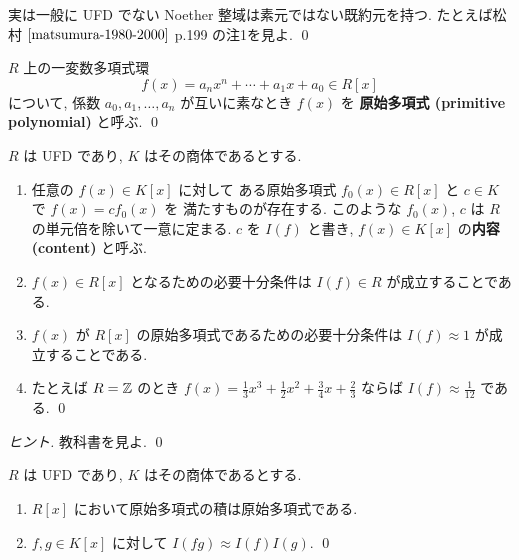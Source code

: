 \documentclass[12pt,twoside]{jarticle}
\begin{document}

\begin{guide}
 実は一般に UFD でない Noether 整域は素元ではない既約元を持つ.
 たとえば松村 $\cite{matsumura-1980-2000}$ p.199 の注1を見よ.
 \qed
\end{guide}

\begin{definition}[原始多項式]
 $R$ 上の一変数多項式環
 \begin{equation*}
  f(x) = a_nx^n + \cdots + a_1x + a_0 \in R[x]
 \end{equation*}
 について, 係数 $a_0,a_1,\ldots,a_n$ が互いに素なとき $f(x)$ を
 {\bf 原始多項式 (\bf primitive polynomial)} と呼ぶ.
 \qed
\end{definition}

\begin{question}[内容]
 $R$ は UFD であり, $K$ はその商体であるとする.
 \begin{enumerate}
  \item  任意の $f(x)\in K[x]$ に対して
   ある原始多項式 $f_0(x)\in R[x]$ と $c\in K$ で $f(x)=cf_0(x)$ を
   満たすものが存在する. 
   このような $f_0(x)$, $c$ は $R$ の単元倍を除いて一意に定まる.
   $c$ を $I(f)$ と書き, $f(x)\in K[x]$ の{\bf 内容 (content)} と呼ぶ.
  \item $f(x)\in R[x]$ となるための必要十分条件は %
   $I(f)\in R$ が成立することである.
  \item $f(x)$ が $R[x]$ の原始多項式であるための必要十分条件は %
   $I(f)\approx 1$ が成立することである.
  \item たとえば $R={\mathbb Z}$ のとき \(
    f(x) = \frac{1}{3}x^3 + \frac{1}{2}x^2 + \frac{3}{4}x + \frac{2}{3}
   \) ならば $I(f)\approx\frac{1}{12}$ である.
  \qed
 \end{enumerate}
\end{question}

\begin{proof}[ヒント]
 教科書を見よ. \qed
\end{proof}

\begin{question}[Gaussの補題]
 $R$ は UFD であり, $K$ はその商体であるとする.
 \begin{enumerate}
 \item $R[x]$ において原始多項式の積は原始多項式である.
 \item $f,g\in K[x]$ に対して $I(fg)\approx I(f)I(g)$.
 \qed
 \end{enumerate}
\end{question}
\end{document}
